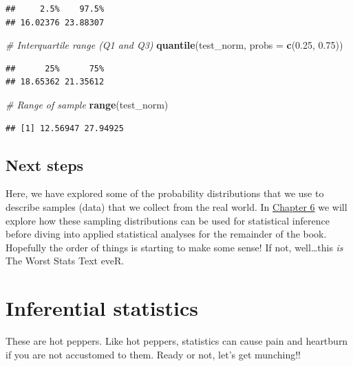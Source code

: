 \documentclass[
]{book}
\newenvironment{Shaded}{\begin{snugshade}}{\end{snugshade}}
\newcommand{\CommentTok}[1]{\textcolor[rgb]{0.56,0.35,0.01}{\textit{#1}}}
\newcommand{\DataTypeTok}[1]{\textcolor[rgb]{0.13,0.29,0.53}{#1}}
\newcommand{\FloatTok}[1]{\textcolor[rgb]{0.00,0.00,0.81}{#1}}
\newcommand{\KeywordTok}[1]{\textcolor[rgb]{0.13,0.29,0.53}{\textbf{#1}}}
\newcommand{\NormalTok}[1]{#1}
\begin{document}
\begin{verbatim}
##     2.5%    97.5% 
## 16.02376 23.88307
\end{verbatim}

\begin{Shaded}
\begin{Highlighting}[]
\CommentTok{# Interquartile range (Q1 and Q3)}
\KeywordTok{quantile}\NormalTok{(test_norm, }\DataTypeTok{probs =} \KeywordTok{c}\NormalTok{(}\FloatTok{0.25}\NormalTok{, }\FloatTok{0.75}\NormalTok{))    }
\end{Highlighting}
\end{Shaded}

\begin{verbatim}
##      25%      75% 
## 18.65362 21.35612
\end{verbatim}

\begin{Shaded}
\begin{Highlighting}[]
\CommentTok{# Range of sample}
\KeywordTok{range}\NormalTok{(test_norm)                             }
\end{Highlighting}
\end{Shaded}

\begin{verbatim}
## [1] 12.56947 27.94925
\end{verbatim}

\hypertarget{next5}{%
\section{Next steps}\label{next5}}

Here, we have explored some of the probability distributions that we use to describe samples (data) that we collect from the real world. In \protect\hyperlink{Chapter6}{Chapter 6} we will explore how these sampling distributions can be used for statistical inference before diving into applied statistical analyses for the remainder of the book. Hopefully the order of things is starting to make some sense! If not, well\ldots this \emph{is} The Worst Stats Text eveR.

\hypertarget{Chapter6}{%
\chapter{Inferential statistics}\label{Chapter6}}

These are hot peppers. Like hot peppers, statistics can cause pain and heartburn if you are not accustomed to them. Ready or not, let's get munching!!
\end{document}
